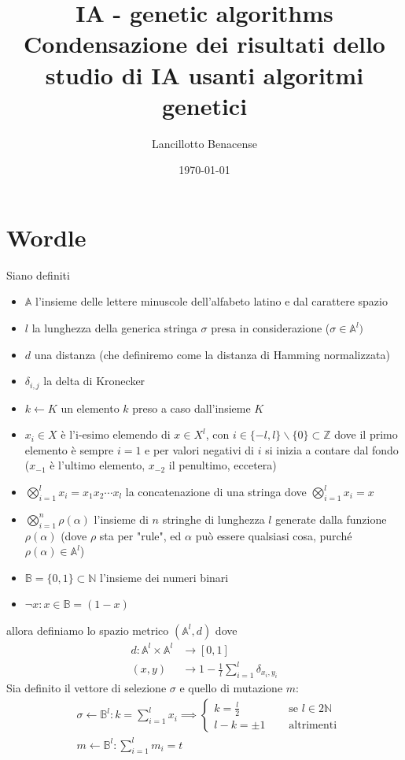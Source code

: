 \documentclass{book}
\title{IA - genetic algorithms \\
\large Condensazione dei risultati dello studio di IA usanti algoritmi genetici}
\author{Lancillotto Benacense}
\date{\today}
\begin{document}
\maketitle

\chapter{Wordle}
Siano definiti
\begin{itemize}
    \item $\mathbb{A}$ l'insieme delle lettere minuscole dell'alfabeto latino e dal carattere spazio
    \item $l$ la lunghezza della generica stringa $\sigma$ presa in considerazione ($ \sigma \in \mathbb{A}^{l})$ 
    \item $d$ una distanza (che definiremo come la distanza di Hamming normalizzata)
    \item $\delta_{i,j}$ la delta di Kronecker
    \item $k \leftarrow K$ un elemento $k$ preso a caso dall'insieme $K$
        \item $x_{i} \in X$ è l'i-esimo elemendo di $x \in X^{l}$, con $i\in \{-l, l\}\backslash\{0\} \subset \mathbb{Z}$ dove il primo elemento è sempre $i=1$ e per valori negativi di $i$ si inizia a contare dal fondo ($x_{-1}$ è l'ultimo elemento, $x_{-2}$ il penultimo, eccetera) 
    \item $\bigotimes_{i=1}^{l} x_{i} = x_{1}x_{2}\cdots x_{l}$ la concatenazione di una stringa dove $\bigotimes_{i=1}^{l} x_{i} = x$
    \item $\bigotimes_{i=1}^{n} \rho(\alpha)$ l'insieme di $n$ stringhe di lunghezza $l$ generate dalla funzione $\rho(\alpha)$ (dove $\rho$ sta per "rule", ed $\alpha$ può essere qualsiasi cosa, purché $\rho(\alpha) \in \mathbb{A}^{l}$)  
    \item $\mathbb{B} = \{0, 1\} \subset \mathbb{N}$ l'insieme dei numeri binari
    \item $\neg x : x \in \mathbb{B} = (1 - x)$
\end{itemize}
allora definiamo lo spazio metrico $(\mathbb{A}^{l}, d)$ dove 
\begin{align*}
    d : \mathbb{A}^{l} \times \mathbb{A}^{l} & \rightarrow [0, 1] \\
    (x, y) & \rightarrow  1 - \frac{1}{l} \sum_{i = 1}^{l} \delta_{x_{i}, y_{i}}
\end{align*}
Sia definito il vettore di selezione $\sigma$ e quello di mutazione $m$: 
\begin{align*}
& \sigma \leftarrow \mathbb{B}^{l} : k = \sum_{i=1}^{l} x_{i} \implies \begin{cases}
k = \frac{l}{2} & \quad \text{ se } l \in 2\mathbb{N} \\
l - k = \pm 1 & \quad \text{ altrimenti}
\end{cases} \\
& m \leftarrow \mathbb{B}^{l} : \sum_{i=1}^{l} m_{i}= t
\end{align*}
\end{document}
